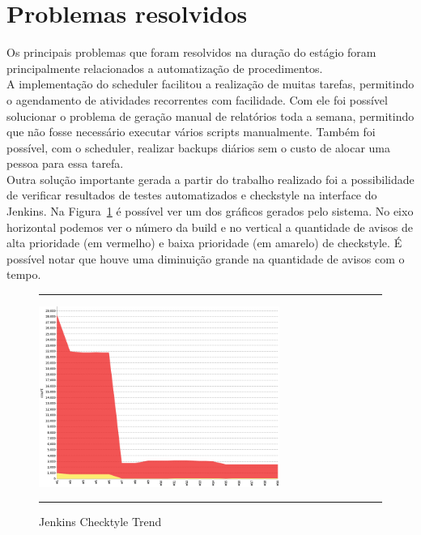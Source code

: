 %
%


\section{Problemas resolvidos}

Os principais problemas que foram resolvidos na duração do estágio foram principalmente relacionados a automatização de procedimentos.\\

A implementação do \gls{scheduler} facilitou a realização de muitas tarefas, permitindo o agendamento de atividades recorrentes com facilidade. Com ele foi possível solucionar o problema de geração manual de relatórios toda a semana, permitindo que não fosse necessário executar vários scripts manualmente. Também foi possível, com o \gls{scheduler}, realizar \glspl{backup} diários sem o custo de alocar uma pessoa para essa tarefa.\\

Outra solução importante gerada a partir do trabalho realizado foi a possibilidade de verificar resultados de testes automatizados e \gls{checkstyle} na interface do \gls{Jenkins}. Na Figura~\ref{fig:jenkinsCheckstyle} é possível ver um dos gráficos gerados pelo sistema. No eixo horizontal podemos ver o número da build e no vertical a quantidade de avisos de alta prioridade (em vermelho) e baixa prioridade (em amarelo) de \gls{checkstyle}. É possível notar que houve uma diminuição grande na quantidade de avisos com o tempo.

\begin{figure}[h]
  \rule[1ex]{\textwidth}{0.25pt}
  \centering\includegraphics[width=0.70\textwidth]{img/Jenkins.png}
  \caption[Jenkins Checkstyle Trend]
  {Jenkins Checktyle Trend}\label{fig:jenkinsCheckstyle}
  \rule[1ex]{\textwidth}{0.25pt}
\end{figure}


